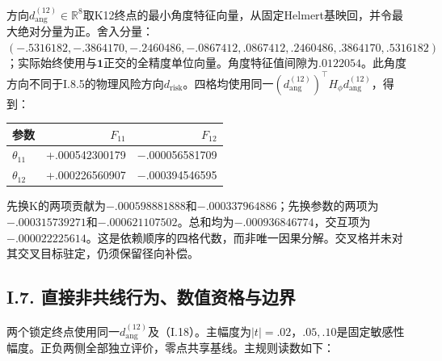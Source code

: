 \documentclass[11pt,a4paper]{article}
\begin{document}
方向\(d_{\mathrm{ang}}^{(12)}\in\mathbb R^8\)取K12终点的最小角度特征向量，从固定Helmert基映回，并令最大绝对分量为正。舍入分量：
\((-.5316182,-.3864170,-.2460486,-.0867412,.0867412,.2460486,.3864170,.5316182)\)；实际始终使用与\(\mathbf1\)正交的全精度单位向量。角度特征值间隙为\(.0122054\)。此角度方向不同于I.8.5的物理风险方向\(d_{\mathrm{risk}}\)。四格均使用同一\((d_{\mathrm{ang}}^{(12)})^\top H_\phi d_{\mathrm{ang}}^{(12)}\)，得到：

\begin{longtable}[]{@{}lrr@{}}
\toprule\noalign{}
参数 & \(F_{11}\) & \(F_{12}\) \\
\midrule\noalign{}
\endhead
\bottomrule\noalign{}
\endlastfoot
\(\theta_{11}\) & +.000542300179 & −.000056581709 \\
\(\theta_{12}\) & +.000226560907 & −.000394546595 \\
\end{longtable}

先换K的两项贡献为\(−.000598881888\)和\(−.000337964886\)；先换参数的两项为\(−.000315739271\)和\(−.000621107502\)。总和均为\(−.000936846774\)，交互项为\(−.000022225614\)。这是依赖顺序的四格代数，而非唯一因果分解。交叉格并未对其交叉目标驻定，仍须保留径向补偿。

\subsection*{I.7.
直接非共线行为、数值资格与边界}\label{i.7.-ux76f4ux63a5ux975eux5171ux7ebfux884cux4e3aux6570ux503cux8d44ux683cux4e0eux8fb9ux754c}

两个锁定终点使用同一\(d_{\mathrm{ang}}^{(12)}\)及（I.18）。主幅度为\(|t|=.02\)，\(.05,.10\)是固定敏感性幅度。正负两侧全部独立评价，零点共享基线。主规则读数如下：
\end{document}

